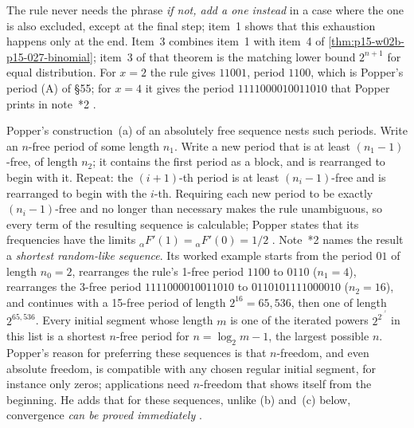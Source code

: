 The rule never needs the phrase \emph{if not, add a one instead} in a
case where the one is also excluded, except at the final step; item~1
shows that this exhaustion happens only at the end. Item~3 combines
item~1 with item~4 of \cref{thm:p15-w02b-p15-027-binomial}; item~3 of
that theorem is the matching lower bound \(2^{n+1}\) for equal
distribution. For \(x=2\) the rule gives \(11001\), period \(1100\),
which is Popper's period (A) of \S55; for \(x=4\) it gives the period
\(1111000010011010\) that Popper prints in note~*2
\parencite[appendix~iv, note~*2, p.~295]{Popper2002LogicDiscoveryUI}.

Popper's construction~(a) of an absolutely free sequence nests such
periods. Write an \(n\)-free period of some length \(n_1\). Write a new
period that is at least \((n_1-1)\)-free, of length \(n_2\); it contains
the first period as a block, and is rearranged to begin with it. Repeat:
the \((i+1)\)-th period is at least \((n_i-1)\)-free and is rearranged to
begin with the \(i\)-th. Requiring each new period to be exactly
\((n_i-1)\)-free and no longer than necessary makes the rule unambiguous,
so every term of the resulting sequence is calculable; Popper states that
its frequencies have the limits \({}_{\alpha}F'(1)={}_{\alpha}F'(0)=1/2\)
\parencite[appendix~iv, pp.~293--295]{Popper2002LogicDiscoveryUI}.
Note~*2 names the result a \emph{shortest random-like sequence}. Its
worked example starts from the period \(01\) of length \(n_0=2\), rearranges
the rule's 1-free period \(1100\) to \(0110\) (\(n_1=4\)), rearranges the
3-free period \(1111000010011010\) to \(0110101111000010\) (\(n_2=16\)),
and continues with a 15-free period of length \(2^{16}=65{,}536\), then one
of length \(2^{65{,}536}\). Every initial segment whose length \(m\) is one
of the iterated powers \(2^{2^{\cdot^{\cdot^{2}}}}\) in this list is a
shortest \(n\)-free period for \(n=\log_2m-1\), the largest possible
\(n\). Popper's reason for preferring these sequences is that
\(n\)-freedom, and even absolute freedom, is compatible with any chosen
regular initial segment, for instance only zeros; applications need
\(n\)-freedom that shows itself from the beginning. He adds that for
these sequences, unlike (b) and~(c) below, convergence \emph{can be proved
immediately} \parencite[appendix~iv, note~*2, pp.~294--295]{Popper2002LogicDiscoveryUI}.

